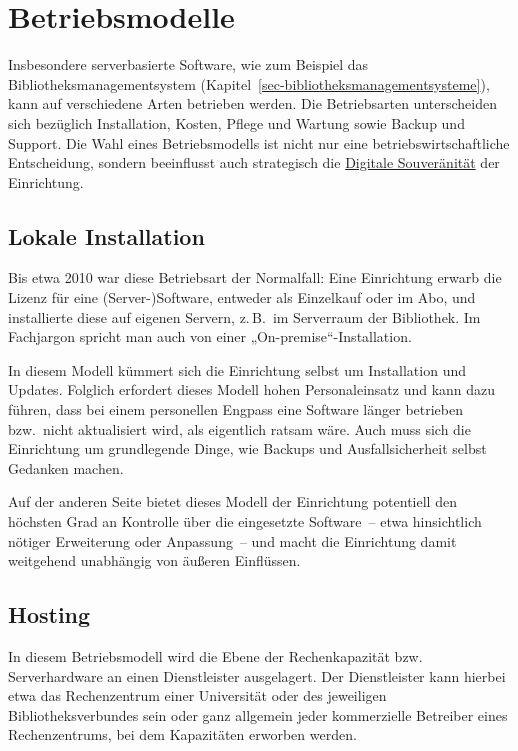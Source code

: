 \documentclass[
  11pt,
  letterpaper,
  DIV=11,
  twoside]{scrreprt}
\begin{document}
\section{Betriebsmodelle}\label{sec-betriebsmodelle}

Insbesondere serverbasierte Software, wie zum Beispiel das
Bibliotheksmanagementsystem
(Kapitel~\ref{sec-bibliotheksmanagementsysteme}), kann auf verschiedene
Arten betrieben werden. Die Betriebsarten unterscheiden sich bezüglich
Installation, Kosten, Pflege und Wartung sowie Backup und Support. Die
Wahl eines Betriebsmodells ist nicht nur eine betriebswirtschaftliche
Entscheidung, sondern beeinflusst auch strategisch die
\hyperref[digitale-souveruxe4nituxe4t]{Digitale Souveränität} der
Einrichtung.

\subsection{Lokale Installation}\label{lokale-installation}

Bis etwa 2010 war diese Betriebsart der Normalfall: Eine Einrichtung
erwarb die Lizenz für eine (Server-)Software, entweder als Einzelkauf
oder im Abo, und installierte diese auf eigenen Servern, z.\,B.~im
Serverraum der Bibliothek. Im Fachjargon spricht man auch von einer
„On-premise``-Installation.

In diesem Modell kümmert sich die Einrichtung selbst um Installation und
Updates. Folglich erfordert dieses Modell hohen Personaleinsatz und kann
dazu führen, dass bei einem personellen Engpass eine Software länger
betrieben bzw.~nicht aktualisiert wird, als eigentlich ratsam wäre. Auch
muss sich die Einrichtung um grundlegende Dinge, wie Backups und
Ausfallsicherheit selbst Gedanken machen.

Auf der anderen Seite bietet dieses Modell der Einrichtung potentiell
den höchsten Grad an Kontrolle über die eingesetzte Software~-- etwa
hinsichtlich nötiger Erweiterung oder Anpassung~-- und macht die
Einrichtung damit weitgehend unabhängig von äußeren Einflüssen.

\subsection{Hosting}\label{hosting}

In diesem Betriebsmodell wird die Ebene der Rechenkapazität bzw.
Serverhardware an einen Dienstleister ausgelagert. Der Dienstleister
kann hierbei etwa das Rechenzentrum einer Universität oder des
jeweiligen Bibliotheksverbundes sein oder ganz allgemein jeder
kommerzielle Betreiber eines Rechenzentrums, bei dem Kapazitäten
erworben werden.
\end{document}
